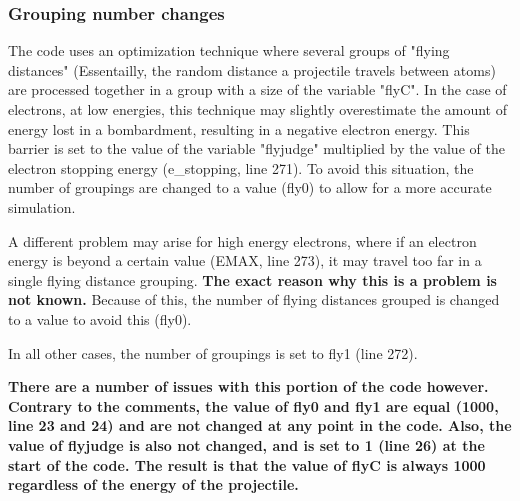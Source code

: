 \documentclass[10pt, reqno]{exam}
\begin{document}
\subsubsection{Grouping number changes}

The code uses an optimization technique where several groups of "flying distances" (Essentailly, the random distance a projectile travels between atoms) are processed together in a group with a size of the variable "flyC". In the case of electrons, at low energies, this technique may slightly overestimate the amount of energy lost in a bombardment, resulting in a negative electron energy. This barrier is set to the value of the variable "flyjudge" multiplied by the value of the electron stopping energy (e\_stopping, line 271). To avoid this situation, the number of groupings are changed to a value (fly0) to allow for a more accurate simulation. \par

A different problem may arise for high energy electrons, where if an electron energy is beyond a certain value (EMAX, line 273), it may travel too far in a single flying distance grouping. \textbf{The exact reason why this is a problem is not known.} Because of this, the number of flying distances grouped is changed to a value to avoid this (fly0). \par

In all other cases, the number of groupings is set to fly1 (line 272). \par

\textbf{There are a number of issues with this portion of the code however. Contrary to the comments, the value of fly0 and fly1 are equal (1000, line 23 and 24) and are not changed at any point in the code. Also, the value of flyjudge is also not changed, and is set to 1 (line 26) at the start of the code. The result is that the value of flyC is always 1000 regardless of the energy of the projectile.} \par
\end{document}
